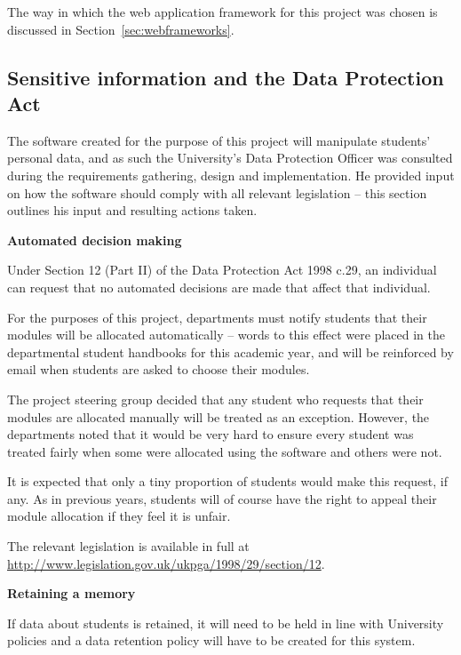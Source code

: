\documentclass[]{scrartcl}
\begin{document}
The way in which the web application framework for this project was chosen is
discussed in Section~\ref{sec:webframeworks}.

\subsection{Sensitive information and the Data Protection Act}
\label{sec:dataprotection}


The software created for the purpose of this project will manipulate students'
personal data, and as such the University's Data Protection Officer was
consulted during the requirements gathering, design and implementation. He
provided input on how the software should comply with all relevant legislation
-- this section outlines his input and resulting actions taken.

\textbf{Automated decision making}

Under Section 12 (Part II) of the Data Protection Act 1998 c.29, an individual
can request that no automated decisions are made that affect that individual.

For the purposes of this project, departments must notify students that their
modules will be allocated automatically -- words to this effect were placed in
the departmental student handbooks for this academic year, and will be
reinforced by email when students are asked to choose their modules.

The project steering group decided that any student who requests that their
modules are allocated manually will be treated as an exception. However, the
departments noted that it would be very hard to ensure every student was
treated fairly when some were allocated using the software and others were
not.

It is expected that only a tiny proportion of students would make this
request, if any. As in previous years, students will of course have the right
to appeal their module allocation if they feel it is unfair.

The relevant legislation is available in full at
\url{http://www.legislation.gov.uk/ukpga/1998/29/section/12}.

\textbf{Retaining a memory}

If data about students is retained, it will need to be held in line with
University policies and a data retention policy will have to be created for
this system.
\end{document}
